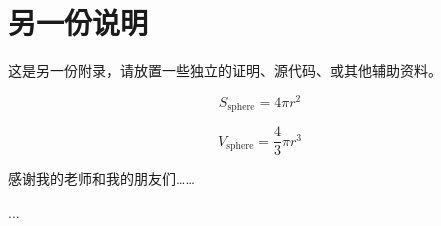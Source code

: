\documentclass[lang=chs, degree=phd, blindreview=false, winfonts=true, academic=true]{yanputhesis}
\begin{document}
\chapter{另一份说明}

这是另一份附录，请放置一些独立的证明、源代码、或其他辅助资料。


\begin{equation}
    S_{\text{sphere}} = 4 \pi r^2
\end{equation}

\begin{equation}
    V_{\text{sphere}} = \frac43 \pi r^3
\end{equation}

\cleardoublepage
\backmatter                                                 %
\begin{acknowledgements}                                    %
    感谢我的老师和我的朋友们……
\end{acknowledgements}                                      %
\begin{accomplishments}                                     %
    [1] ...
\end{accomplishments}                                       %
\makestatement                                              %
\end{document}
